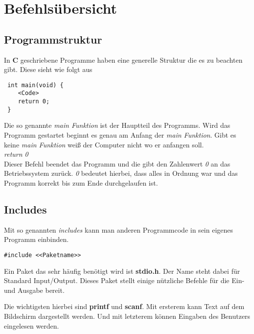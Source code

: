 \documentclass[c_worksheet.tex]{subfiles}
\begin{document}
	
\chapter{Befehlsübersicht} 

\section{Programmstruktur}

In \textbf{C} geschriebene Programme haben eine generelle Struktur die es zu beachten gibt. Diese sieht wie folgt aus

\begin{lstlisting}
 int main(void) {
    <Code>
    return 0;
 }
 \end{lstlisting} 

Die so genannte \emph{main Funktion} ist der Hauptteil des Programms. Wird das Programm gestartet beginnt es genau am Anfang der \emph{main Funktion}. Gibt es keine \emph{main Funktion} weiß der Computer nicht wo er anfangen soll. \\

\textit{return 0} \\

Dieser Befehl beendet das Programm und die gibt den Zahlenwert \emph{0} an das Betriebssystem zurück. \emph{0} bedeutet hierbei, dass alles in Ordnung war und das Programm korrekt bis zum Ende durchgelaufen ist.



\section{Includes} 

Mit so genannten \emph{includes} kann man anderen Programmcode in sein eigenes Programm einbinden.

\begin{lstlisting}
#include <<Paketname>>
\end{lstlisting}

Ein Paket das sehr häufig benötigt wird ist \textbf{stdio.h}. Der Name steht dabei für Standard Input/Output. Dieses Paket stellt einige nützliche Befehle für die Ein- und Ausgabe bereit.

Die wichtigsten hierbei sind \textbf{printf} und \textbf{scanf}. Mit ersterem kann Text auf dem Bildschirm dargestellt werden. Und mit letzterem können Eingaben des Benutzers eingelesen werden.

 
\end{document}
